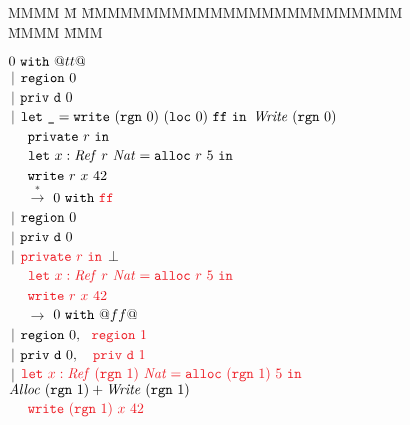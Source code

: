 
\begin{figure}
\vspace{5em}

\begin{tabbing}
MMMM \= M \= MMMMMMMMMMMMMMMMMMMMMMMMM \= MMMM \= MMM \kill

   \>      \> $\sbvalue{0}{@tt@}$                                                                  
\\ \> $~|$ \> $\sregion{0}$                                                                        
\\ \> $~|$ \> $\fprivd{0}$                                                                         
\\ \> $~|$ \> $\klet~ \tt{\_} = \tt{write}~ (\trgn{0})~ (\xloc{0})~ \tt{ff}~ \kin$             
                                        \> $\tcWrite~(\trgn{0})$                                
\\ \>      \> ~~ $\kprivate~ r~ \kin$                                                              
\\ \>      \> ~~ $\klet~ x : \tcRef~ r~ \tcNat = \tt{alloc}~ r~ 5~ \kin$                           
\\ \>      \> ~~ $\tt{write}~ r~ x~ 42$
\\[1.5ex]


~~ $\stackrel{*}{\longrightarrow}$
   \>      \> $\sbvalue{0}{\cdiff{\tt{ff}}}$                                                       
\\ \> $~|$ \> $\sregion{0}$                                                                        
\\ \> $~|$ \> $\fprivd{0}$                                                                           
\\ \> $~|$ \> $\cdiff{\kprivate~ r~ \kin}$             \> $\bot$                                       
\\ \>      \> ~~ $\cdiff{\klet~ x : \tcRef~ r~ \tcNat = \tt{alloc}~ r~ 5~ \kin}$                   
\\ \>      \> ~~ $\cdiff{\tt{write}~ r~ x~ 42}$
\\[1.5ex]


~~ $\longrightarrow$
   \>      \> $\sbvalue{0}{@ff@}$                                                                  
\\ \> $~|$ \> $\sregion{0},
                ~~ \cdiff{\sregion{1}}$                                                         
\\ \> $~|$ \> $\fprivd{0},
                ~~~ \cdiff{\fprivd{1}}$
\\ \> $~|$ \> $\cdiff{\klet~ x : \tcRef~ (\trgn{1})~ \tcNat = \tt{alloc}~ (\trgn{1})~ 5~ \kin}$
                                        \> $\tcAlloc~ (\trgn{1}) + \tcWrite~ (\trgn{1})$     
\\ \>      \> ~~ $\cdiff{\tt{write}~ (\trgn{1})~ x~ 42}$
\\[1.5ex]



\end{tabbing}
\end{figure}
